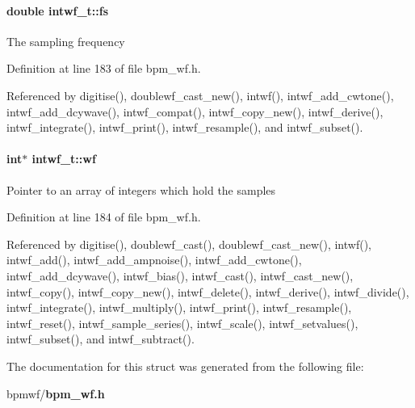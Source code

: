 \paragraph[fs]{\setlength{\rightskip}{0pt plus 5cm}double {\bf intwf\_\-t::fs}}\hfill\label{structintwf__t_b0d66ade539e6f2440357e540716a49f}


The sampling frequency 

Definition at line 183 of file bpm\_\-wf.h.

Referenced by digitise(), doublewf\_\-cast\_\-new(), intwf(), intwf\_\-add\_\-cwtone(), intwf\_\-add\_\-dcywave(), intwf\_\-compat(), intwf\_\-copy\_\-new(), intwf\_\-derive(), intwf\_\-integrate(), intwf\_\-print(), intwf\_\-resample(), and intwf\_\-subset().
\paragraph[wf]{\setlength{\rightskip}{0pt plus 5cm}int$\ast$ {\bf intwf\_\-t::wf}}\hfill\label{structintwf__t_3fa321b84fdc1ccd3c4bcd789da5b95c}


Pointer to an array of integers which hold the samples 

Definition at line 184 of file bpm\_\-wf.h.

Referenced by digitise(), doublewf\_\-cast(), doublewf\_\-cast\_\-new(), intwf(), intwf\_\-add(), intwf\_\-add\_\-ampnoise(), intwf\_\-add\_\-cwtone(), intwf\_\-add\_\-dcywave(), intwf\_\-bias(), intwf\_\-cast(), intwf\_\-cast\_\-new(), intwf\_\-copy(), intwf\_\-copy\_\-new(), intwf\_\-delete(), intwf\_\-derive(), intwf\_\-divide(), intwf\_\-integrate(), intwf\_\-multiply(), intwf\_\-print(), intwf\_\-resample(), intwf\_\-reset(), intwf\_\-sample\_\-series(), intwf\_\-scale(), intwf\_\-setvalues(), intwf\_\-subset(), and intwf\_\-subtract().

The documentation for this struct was generated from the following file:\begin{CompactItemize}
\item 
bpmwf/{\bf bpm\_\-wf.h}\end{CompactItemize}
